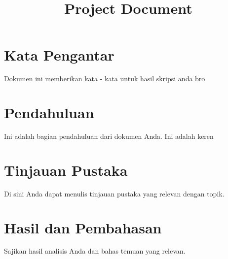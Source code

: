 \documentclass{article}
\begin{document}
\title{Project Document}



\maketitle



\section{Kata Pengantar}

Dokumen ini memberikan kata - kata untuk hasil skripsi anda bro











\section{Pendahuluan}

Ini adalah bagian pendahuluan dari dokumen Anda. Ini adalah keren

\section{Tinjauan Pustaka}

Di sini Anda dapat menulis tinjauan pustaka yang relevan dengan topik.







\section{Hasil dan Pembahasan}

Sajikan hasil analisis Anda dan bahas temuan yang relevan. 
\end{document}
